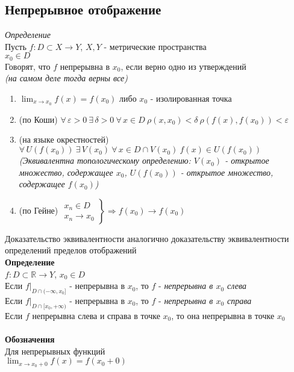 \documentclass[12pt]{article}
\begin{document}
\subsection{Непрерывное отображение}
\textit{Определение}\\
Пусть $f:D\subset X \rightarrow Y$, $X,Y$ - метрические пространства\\
$x_0 \in D$\\
Говорят, что $f$ непрерывна в $x_0$, если верно одно из утверждений\\
\textit{(на самом деле тогда верны все)}
\begin{enumerate}
    \item $\lim_{x \rightarrow x_0} f(x) = f(x_0)$ либо $x_0$ - изолированная точка
    \item (по Коши) $\forall\,\varepsilon > 0\ \exists\,\delta > 0\ \forall\,x\in D\ \rho(x,x_0)<\delta\ \rho(f(x), f(x_0)) < \varepsilon$
    \item (на языке окрестностей) $\forall\,U(f(x_0))\ \exists\,V(x_0)\ \forall\, x\in D \cap V(x_0)\ f(x) \in U(f(x_0))$\\
    \textit{(Эквивалентна топологическому определению: $V(x_0)$ - открытое множество, содержащее $x_0$, $U(f(x_0))$ - открытое множество, содержащее $f(x_0)$)}
    \item (по Гейне) $\left.\begin{array}{c}
         x_n \in D \\
         x_n \rightarrow x_0
    \end{array}\right\}\Rightarrow f(x_0) \rightarrow f(x_0)$
\end{enumerate}
Доказательство эквивалентности аналогично доказательству эквивалентности определений пределов отображений\\
\textbf{Определение}\\
$f:D\subset\mathbb{R} \rightarrow Y$, $x_0\in D$\\
Если $f|_{D\cap (-\infty, x_0]}$ - непрерывна в $x_0$, то $f$ - \textit{непрерывна в $x_0$ слева}\\
Если $f|_{D\cap [x_0, +\infty)}$ - непрерывна в $x_0$, то $f$ - \textit{непрерывна в $x_0$ справа}\\
Если $f$ непрерывна слева и справа в точке $x_0$, то она непрерывна в точке $x_0$\\\\
\textbf{Обозначения}\\
Для непрерывных функций\\
$\lim_{x\rightarrow x_0+0} f(x) = f(x_0+0)$\\
\end{document}
